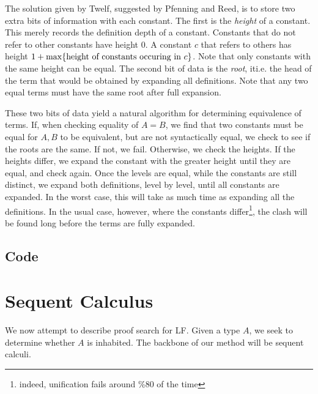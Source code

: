 \documentclass[11pt,twoside]{article}
\begin{document}
  The solution given by Twelf, suggested by 
Pfenning and Reed, is to store two extra bits of information 
with each constant.  The first is the \emph{height} of a constant.
This merely records the definition depth of a constant.  Constants that
do not refer to other constants have height 0.  A constant $c$ that refers
to others has height $1 + \max\{\mbox{height of constants occuring in } c\}$.
Note that only constants with the same height can be equal.  
The second bit of data is the \emph{root}, it{i.e.} the head of the term that would be obtained by 
expanding all definitions.  Note that any two equal terms must have the
same root after full expansion. 

These two bits of data yield a natural algorithm for determining 
equivalence of terms.  If, when checking equality of $A=B$,
we find that two constants must be equal for $A,B$ to
be equivalent, but are not syntactically equal, 
we check to see if the roots are the same.
If not, we fail.  Otherwise, we check the heights.  If the heights
differ, we expand the constant with the greater height until 
they are equal, and check again.  Once the levels
are equal, while the constants are still distinct, we 
expand both definitions, level by level, until all constants
are expanded.  In the worst case, this will take as much time
as expanding all the definitions.  In the usual case, however,
where the constants differ\footnote{indeed, unification fails
around \%80 of the time}, the clash will be found long before
the terms are fully expanded.  

\subsection{Code}




\section{Sequent Calculus}

We now attempt to describe proof search for LF.
Given a type $A$, we seek to determine whether $A$ 
is inhabited. The backbone of our method will be sequent calculi.

\renewcommand{\PiTyp}[3]{\Pi #1 : #2.\ #3}
\renewcommand{\Lam}[2]{\lambda #1.\ #2}
\end{document}
